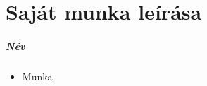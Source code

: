 \chapter*{Saját munka leírása}

\ifdefined\printName
    \paragraph{Név}
\fi

\begin{itemize}
    \item
    {Munka}
\end{itemize}
